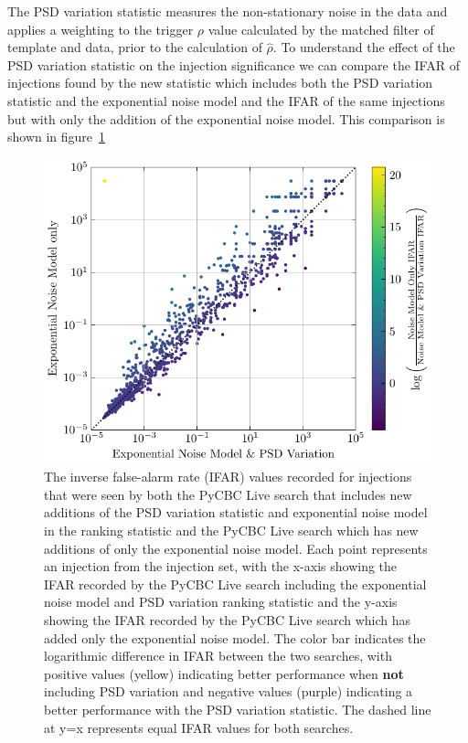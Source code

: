The PSD variation statistic measures the non-stationary noise in the data and applies a weighting to the trigger $\rho$ value calculated by the matched filter of template and data, prior to the calculation of $\hat{\rho}$. To understand the effect of the PSD variation statistic on the injection significance we can compare the IFAR of injections found by the new statistic which includes both the PSD variation statistic and the exponential noise model and the IFAR of the same injections but with only the addition of the exponential noise model. This comparison is shown in figure~\ref{5:fig:ifar-ifar-fits-vs-fits-psdvar}
%
\begin{figure}
       \centering
    \includegraphics[width=1\textwidth]{images/5_pycbclive/fits-only/fits_only_fits_psd_var_ifar_vs_ifar.pdf}
    \caption{The inverse false-alarm rate (IFAR) values recorded for injections that were seen by both the PyCBC Live search that includes new additions of the PSD variation statistic and exponential noise model in the ranking statistic and the PyCBC Live search which has new additions of only the exponential noise model. Each point represents an injection from the injection set, with the x-axis showing the IFAR recorded by the PyCBC Live search including the exponential noise model and PSD variation ranking statistic and the y-axis showing the IFAR recorded by the PyCBC Live search which has added only the exponential noise model. The color bar indicates the logarithmic difference in IFAR between the two searches, with positive values (yellow) indicating better performance when \textbf{not} including PSD variation and negative values (purple) indicating a better performance with the PSD variation statistic. The dashed line at y=x represents equal IFAR values for both searches.}
    \label{5:fig:ifar-ifar-fits-vs-fits-psdvar}
\end{figure}
